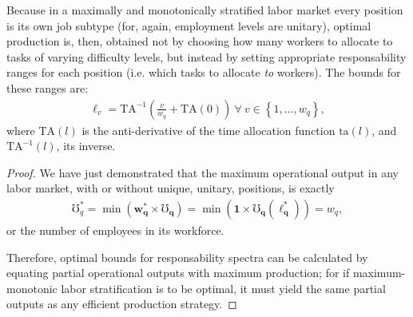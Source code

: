 \documentclass[hidelinks, nonatbib]{elsarticle}
\begin{document}
\begin{lemma}
    Because in a maximally and monotonically stratified labor market every position is its own job subtype (for, again, employment levels are unitary), optimal production is, then, obtained not by choosing how many workers to allocate to tasks of varying difficulty levels, but instead by setting appropriate responsability ranges for each position (i.e. which tasks to allocate \textit{to} workers). The bounds for these ranges are:
    \begin{gather}
    \ell_v
    =
    \text{TA}^{-1}\left(
        \frac{v}{w_q}
        +
        \text{TA}(0)
    \right)
    \
    \forall
    \
    v \in 
    \left\{
        1, \dots, w_q
    \right\}
    ,
    \end{gather}
    where $\text{TA}(l)$ is the anti-derivative of the time allocation function $\text{ta}(l)$, and $\text{TA}^{-1}(l)$, its inverse.
    
    \begin{proof}
        
        We have just demonstrated that the maximum operational output in any labor market, with or without unique, unitary, positions, is exactly 
        \begin{gather}
        \mho_{q}^{*}
            =
            \min(
                \boldsymbol{w_{q}^{*}}
                \times
                \boldsymbol{\mho_q}
            )
            = 
            \min(
                \boldsymbol{1}
                \times
                \boldsymbol{\mho_q}(
                    \boldsymbol{\ell_{q}^{*}}
                )
            )
            =
            w_q
        ,
        \end{gather}
        or the number of employees in its workforce.
        
        Therefore, optimal bounds for responsability spectra can be calculated by equating partial operational outputs with maximum production; for if maximum-monotonic labor stratification is to be optimal, it must yield the same partial outputs as any efficient production strategy.
        

\end{proof}
\end{lemma}
\end{document}

